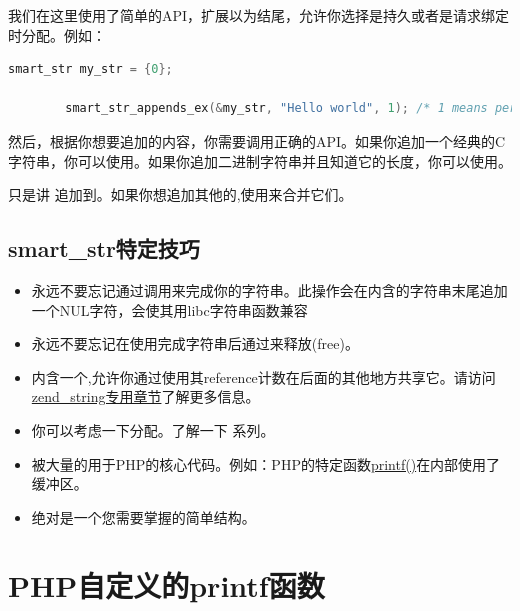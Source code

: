 我们在这里使用了简单的API，扩展以为结尾，允许你选择是持久或者是请求绑定时分配。例如：

\begin{lstlisting}[language=c]
        smart_str my_str = {0};

        smart_str_appends_ex(&my_str, "Hello world", 1); /* 1 means persistent allocation */
\end{lstlisting} 

然后，根据你想要追加的内容，你需要调用正确的API。如果你追加一个经典的C字符串，你可以使用。如果你追加二进制字符串并且知道它的长度，你可以使用。

只是讲 追加到。如果你想追加其他的,使用来合并它们。

\subsection{smart\_str特定技巧}

\begin{itemize}
        \item 永远不要忘记通过调用来完成你的字符串。此操作会在内含的字符串末尾追加一个NUL字符，会使其用libc字符串函数兼容
        \item 永远不要忘记在使用完成字符串后通过来释放(free)。
        \item {}内含一个,允许你通过使用其reference计数在后面的其他地方共享它。请访问\href{http://www.phpinternalsbook.com/php7/internal_types/strings/zend_strings.html}{zend\_string专用章节}了解更多信息。
        \item 你可以考虑一下分配。了解一下 系列。
        \item {}被大量的用于PHP的核心代码。例如：PHP的特定函数\href{http://www.phpinternalsbook.com/php7/internal_types/strings/printing_functions.html}{printf()}在内部使用了缓冲区。
        \item {}绝对是一个您需要掌握的简单结构。
\end{itemize}  


\section{PHP自定义的printf函数}

